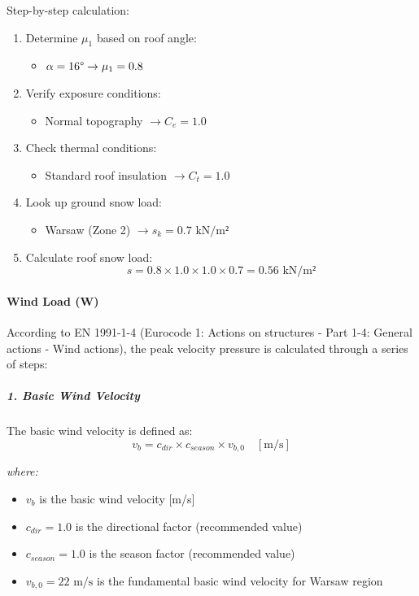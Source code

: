 \documentclass[12pt,a4paper]{article}
\begin{document}
\noindent
Step-by-step calculation:
\begin{enumerate}
    \item Determine $\mu_1$ based on roof angle:
        \begin{itemize}
            \item $\alpha = 16\degree \rightarrow \mu_1 = 0.8$
        \end{itemize}
    \item Verify exposure conditions:
        \begin{itemize}
            \item Normal topography $\rightarrow C_e = 1.0$
        \end{itemize}
    \item Check thermal conditions:
        \begin{itemize}
            \item Standard roof insulation $\rightarrow C_t = 1.0$
        \end{itemize}
    \item Look up ground snow load:
        \begin{itemize}
            \item Warsaw (Zone 2) $\rightarrow s_k = 0.7 \text{ kN/m²}$
        \end{itemize}
    \item Calculate roof snow load:
        \begin{equation}
        s = 0.8 \times 1.0 \times 1.0 \times 0.7 = 0.56 \text{ kN/m²}
        \end{equation}
\end{enumerate}

\paragraph{Wind Load (W)}
According to EN 1991-1-4 (Eurocode 1: Actions on structures - Part 1-4: General actions - Wind actions), the peak velocity pressure is calculated through a series of steps:

\subparagraph{1. Basic Wind Velocity}
The basic wind velocity is defined as:
\begin{equation}
v_b = c_{dir} \times c_{season} \times v_{b,0} \quad [\text{m/s}]
\end{equation}

\noindent
\textit{where:}
\begin{itemize}
    \item $v_b$ is the basic wind velocity [m/s]
    \item $c_{dir} = 1.0$ is the directional factor (recommended value)
    \item $c_{season} = 1.0$ is the season factor (recommended value)
    \item $v_{b,0} = 22 \text{ m/s}$ is the fundamental basic wind velocity for Warsaw region
\end{itemize}
\end{document}
